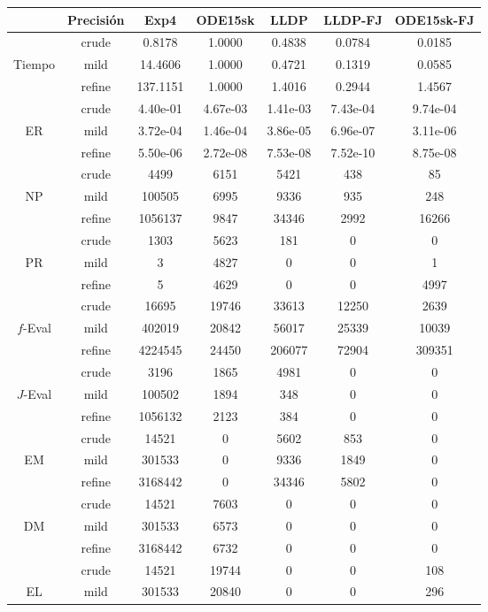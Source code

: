 \begin{table}[htb]
\centering
\begin{tabular}{ |c|c|c|c|c|c|c| }
\hline
 & Precisi\'on & Exp4 & ODE15sk & LLDP & LLDP-FJ & ODE15sk-FJ \\
\hline
  & crude & 0.8178 & 1.0000 & 0.4838 & 0.0784 & 0.0185 \\
 Tiempo  & mild & 14.4606 & 1.0000 & 0.4721 & 0.1319 & 0.0585 \\
  & refine & 137.1151 & 1.0000 & 1.4016 & 0.2944 & 1.4567 \\
\hline
  & crude & 4.40e-01 & 4.67e-03 & 1.41e-03 & 7.43e-04 & 9.74e-04 \\
 ER  & mild & 3.72e-04 & 1.46e-04 & 3.86e-05 & 6.96e-07 & 3.11e-06 \\
  & refine & 5.50e-06 & 2.72e-08 & 7.53e-08 & 7.52e-10 & 8.75e-08 \\
\hline
  & crude & 4499 & 6151 & 5421 & 438 & 85 \\
 NP  & mild & 100505 & 6995 & 9336 & 935 & 248 \\
  & refine & 1056137 & 9847 & 34346 & 2992 & 16266 \\
\hline
  & crude & 1303 & 5623 & 181 & 0 & 0 \\
 PR  & mild & 3 & 4827 & 0 & 0 & 1 \\
  & refine & 5 & 4629 & 0 & 0 & 4997 \\
\hline
  & crude & 16695 & 19746 & 33613 & 12250 & 2639 \\
 $f$-Eval  & mild & 402019 & 20842 & 56017 & 25339 & 10039 \\
  & refine & 4224545 & 24450 & 206077 & 72904 & 309351 \\
\hline
  & crude & 3196 & 1865 & 4981 & 0 & 0 \\
 $J$-Eval  & mild & 100502 & 1894 & 348 & 0 & 0 \\
  & refine & 1056132 & 2123 & 384 & 0 & 0 \\
\hline
  & crude & 14521 & 0 & 5602 & 853 & 0 \\
 EM  & mild & 301533 & 0 & 9336 & 1849 & 0 \\
  & refine & 3168442 & 0 & 34346 & 5802 & 0 \\
\hline
  & crude & 14521 & 7603 & 0 & 0 & 0 \\
 DM  & mild & 301533 & 6573 & 0 & 0 & 0 \\
  & refine & 3168442 & 6732 & 0 & 0 & 0 \\
\hline
  & crude & 14521 & 19744 & 0 & 0 & 108 \\
 EL  & mild & 301533 & 20840 & 0 & 0 & 296 \\

\end{tabular}
\end{table}

